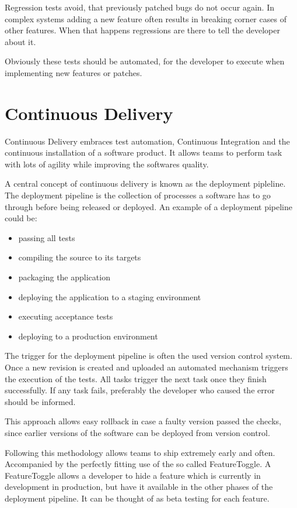 Regression tests avoid, that previously patched bugs do not occur again. In
complex systems adding a new feature often results in breaking corner cases of
other features. When that happens regressions are there to tell the developer
about it.

Obviously these tests should be automated, for the developer to execute when
implementing new features or patches.

\section{Continuous Delivery}

Continuous Delivery embraces test automation, Continuous Integration and the
continuous installation of a software product. It allows teams to perform task
with lots of agility while improving the softwares quality.

A central concept of continuous delivery is known as the deployment pipleline.
The deployment pipeline is the collection of processes a software has to go
through before being released or deployed. An example of a deployment pipeline
could be: 

\begin{itemize}
  \item{passing all tests}
  \item{compiling the source to its targets}
  \item{packaging the application}
  \item{deploying the application to a staging environment}
  \item{executing acceptance tests}
  \item{deploying to a production environment}
\end{itemize}

The trigger for the deployment pipeline is often the used version control
system. Once a new revision is created and uploaded an automated mechanism
triggers the execution of the tests. All tasks trigger the next task once they
finish successfully. If any task fails, preferably the developer who caused the
error should be informed.

This approach allows easy rollback in case a faulty version passed the checks,
since earlier versions of the software can be deployed from version control.

Following this methodology allows teams to ship extremely early and often.
Accompanied by the perfectly fitting use of the so called FeatureToggle. A
FeatureToggle allows a developer to hide a feature which is currently in
development in production, but have it available in the other phases of the
deployment pipeline. It can be thought of as beta testing for each feature.

